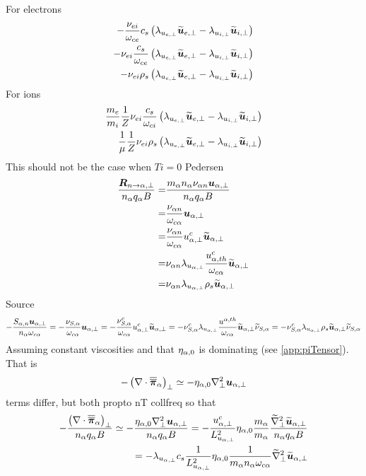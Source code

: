 %
For electrons
%
\begin{align*}
-
\frac{\nu_{ei} }{\omega_{ce}}
c_s
\left( \lambda_{u_{e,\perp}}\widetilde{ \boldsymbol{u}}_{e,\perp}-\lambda_{u_{i,\perp}}\widetilde{ \boldsymbol{u}}_{i,\perp}\right)
\\
-
\nu_{ei}
\frac{ c_s}{\omega_{ce}}
\left( \lambda_{u_{e,\perp}}\widetilde{ \boldsymbol{u}}_{e,\perp}-\lambda_{u_{i,\perp}}\widetilde{ \boldsymbol{u}}_{i,\perp}\right)
\\
-
\nu_{ei}
\rho_s
\left( \lambda_{u_{e,\perp}}\widetilde{ \boldsymbol{u}}_{e,\perp}-\lambda_{u_{i,\perp}}\widetilde{ \boldsymbol{u}}_{i,\perp}\right)
\end{align*}
%
For ions
%
\begin{align*}
\frac{m_e}{m_i}
\frac{1}{Z}
\nu_{ei}
\frac{ c_s}{\omega_{ci}}
\left( \lambda_{u_{e,\perp}}\widetilde{ \boldsymbol{u}}_{e,\perp}-\lambda_{u_{i,\perp}}\widetilde{ \boldsymbol{u}}_{i,\perp}\right)
\\
\frac{1}{\mu}
\frac{1}{Z}
\nu_{ei}
\rho_s
\left( \lambda_{u_{e,\perp}}\widetilde{ \boldsymbol{u}}_{e,\perp}-\lambda_{u_{i,\perp}}\widetilde{ \boldsymbol{u}}_{i,\perp}\right)
\end{align*}
%
This should not be the case when $Ti=0$
Pedersen
%
\begin{align*}
\frac{ \boldsymbol{R}_{n \to \alpha,\perp} }{n_\alpha q_\alpha B}
=&
\frac{ m_\alpha n_\alpha \nu_{\alpha n}\boldsymbol{u}_{\alpha,\perp} }{n_\alpha q_\alpha B}
\\
=&
\frac{\nu_{\alpha n} }{\omega_{c\alpha}}\boldsymbol{u}_{\alpha,\perp}
\\
=&
\frac{\nu_{\alpha n} }{\omega_{c\alpha}}u^c_{\alpha,\perp}\widetilde{ \boldsymbol{u}}_{\alpha,\perp}
\\
=&
\nu_{\alpha n}\lambda_{u_{\alpha,\perp}}\frac{u^c_{\alpha,th}}{\omega_{c\alpha}}\widetilde{ \boldsymbol{u}}_{\alpha,\perp}
\\
=&
\nu_{\alpha n}\lambda_{u_{\alpha,\perp}}\rho_s\widetilde{ \boldsymbol{u}}_{\alpha,\perp}
\end{align*}
%
Source
%
\begin{align*}
- \frac{ S_{\alpha,n}\boldsymbol{u}_{\alpha,\perp} }{n_\alpha \omega_{c\alpha}}
=
- \frac{ \nu_{S,\alpha} }{\omega_{c\alpha}}\boldsymbol{u}_{\alpha,\perp}
=
- \frac{ \nu^c_{S,\alpha}}{\omega_{c\alpha}}u^c_{\alpha,\perp}\widetilde{ \boldsymbol{u}}_{\alpha,\perp}
=
-  \nu^c_{S,\alpha}\lambda_{u_{\alpha,\perp}}\frac{u^{\alpha,th}}{\omega_{c\alpha}}\widetilde{ \boldsymbol{u}}_{\alpha,\perp} \widetilde{ \nu}_{S,\alpha}
=
-  \nu^c_{S,\alpha}\lambda_{u_{\alpha,\perp}}\rho_s\widetilde{ \boldsymbol{u}}_{\alpha,\perp} \widetilde{ \nu}_{S,\alpha}
\end{align*}
%
Assuming constant viscosities and that $\eta_{\alpha,0}$ is dominating (see \cref{app:piTensor}).
That is
%
\begin{align*}
-  \left(\nabla\cdot\boldsymbol{\overline{\overline{\pi}}}_\alpha\right)_\perp \simeq
-  \eta_{\alpha,0}\nabla_\perp^2\boldsymbol{u}_{\alpha,\perp}
\end{align*}
%
terms differ, but both propto nT collfreq
so that
%
\begin{align*}
- \frac{ \left(\nabla\cdot\boldsymbol{\overline{\overline{\pi}}}_\alpha\right)_\perp }{n_\alpha  q_\alpha B}
\simeq
- \frac{ \eta_{\alpha,0}\nabla_\perp^2\boldsymbol{u}_{\alpha,\perp} }{n_\alpha  q_\alpha B}
=
- \frac{u^c_{\alpha,\perp}}{L_{u_{\alpha,\perp}}^2}
\eta_{\alpha,0}
\frac{m_\alpha}{m_\alpha}
\frac{ \widetilde{ \nabla}_\perp^2\widetilde{ \boldsymbol{u}}_{\alpha,\perp} }{n_\alpha  q_\alpha B}
\\
=
-
 \lambda_{u_{\alpha,\perp}}c_s
\frac{1}{L_{u_{\alpha,\perp}}^2}
\eta_{\alpha,0}
\frac{1}{m_\alpha n_\alpha\omega_{c\alpha}}
\widetilde{ \nabla}_\perp^2\widetilde{ \boldsymbol{u}}_{\alpha,\perp}
\end{align*}
